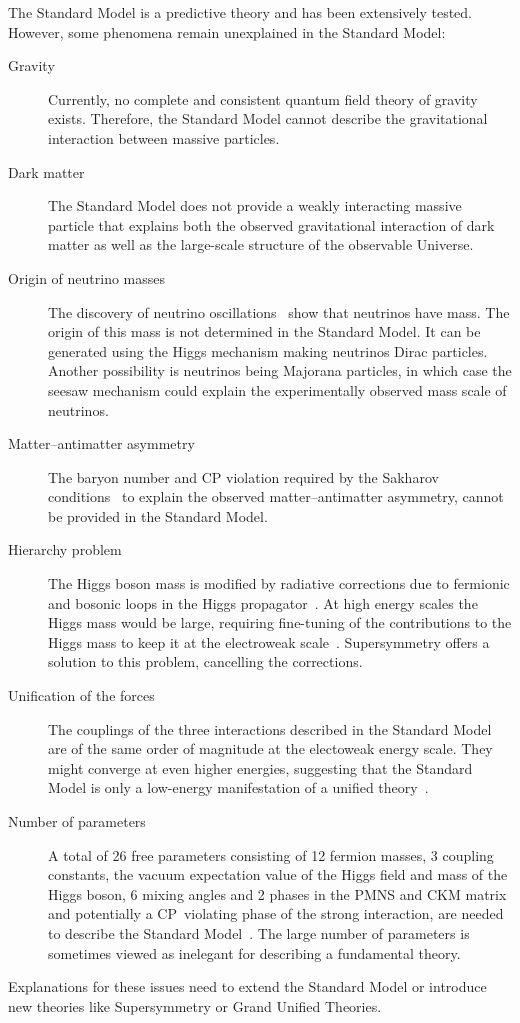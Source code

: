 The Standard Model is a predictive theory and has been extensively tested.
However, some phenomena remain unexplained in the Standard Model:
\begin{description}
\item[Gravity] Currently, no complete and consistent quantum field theory of
  gravity exists. Therefore, the Standard Model cannot describe the
  gravitational interaction between massive particles.

\item[Dark matter] The Standard Model does not provide a weakly interacting
  massive particle that explains both the observed gravitational interaction of
  dark matter as well as the large-scale structure of the observable Universe.

\item[Origin of neutrino masses] The discovery of neutrino
  oscillations~\cite{superk_neutrino, sno_neutrino_1, sno_neutrino_2} show that
  neutrinos have mass. The origin of this mass is not determined in the Standard
  Model. It can be generated using the Higgs mechanism making neutrinos Dirac
  particles. Another possibility is neutrinos being Majorana particles, in which
  case the seesaw mechanism could explain the experimentally observed mass scale
  of neutrinos.

\item[Matter--antimatter asymmetry] The baryon number and CP violation required
  by the Sakharov conditions~\cite{sakharov} to explain the observed
  matter--antimatter asymmetry, cannot be provided in the Standard Model.

\item[Hierarchy problem] The Higgs boson mass is modified by radiative
  corrections due to fermionic and bosonic loops in the Higgs
  propagator~\cite{bettini}. At high energy scales the Higgs mass would be
  large, requiring fine-tuning of the contributions to the Higgs mass to keep it
  at the electroweak scale~\cite{thomson}. Supersymmetry offers a solution to
  this problem, cancelling the corrections.

\item[Unification of the forces] The couplings of the three interactions
  described in the Standard Model are of the same order of magnitude at the
  electoweak energy scale. They might converge at even higher energies,
  suggesting that the Standard Model is only a low-energy manifestation of a
  unified theory~\cite{thomson}.

\item[Number of parameters] A total of 26 free parameters consisting of 12
  fermion masses, 3 coupling constants, the vacuum expectation value of the
  Higgs field and mass of the Higgs boson, 6 mixing angles and 2 phases in the
  PMNS and CKM matrix and potentially a CP~violating phase of the strong
  interaction, are needed to describe the Standard Model~\cite{thomson}. The
  large number of parameters is sometimes viewed as inelegant for describing a
  fundamental theory.
\end{description}
Explanations for these issues need to extend the Standard Model or introduce new
theories like Supersymmetry or Grand Unified Theories.

